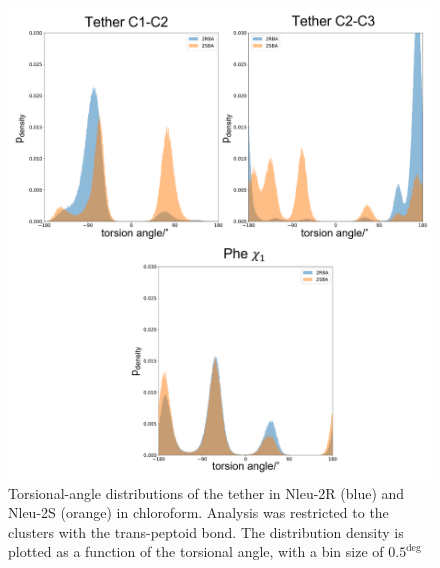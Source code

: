 \begin{figure}
    \centering
    \includegraphics[width=\textwidth]{7_chapter_5/fig/results/dihedral_dist_Wat.png}
    \caption{Torsional-angle distributions of the tether in Nleu-2R (blue) and             Nleu-2S  (orange)  in  chloroform.  Analysis  was  restricted  to  the         clusters  with  the  trans-peptoid bond. The distribution density is           plotted as a function of the torsional angle, with a bin size of               $0.5^{\deg}$}
    \label{fig: SITorsion2RS}
\end{figure}
